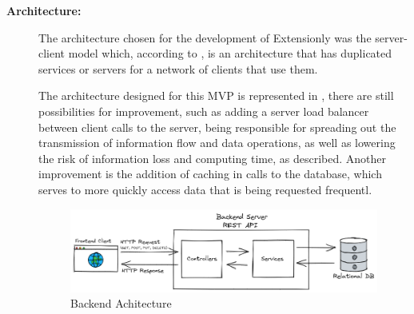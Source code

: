 \begin{description}
    
    \item[\textbf{Architecture:}] The architecture chosen for the development of Extensionly was the server-client model which, according to \textcite{puliafito_riccobene_scarpa}, is an architecture that has duplicated services or servers for a network of clients that use them.
    
    
    The architecture designed for this \ac{MVP} is represented in , there are still possibilities for improvement, such as adding a server load balancer between client calls to the server, being responsible for spreading out the transmission of information flow and data operations, as well as lowering the risk of information loss and computing time, as \textcite{Chen_2015} described.
    Another improvement is the addition of caching in calls to the database, which serves to more quickly access data that is being requested frequentl.
    
    \begin{figure}[htb]
      \caption{Backend Achitecture}\label{fig:architecture}
      \begin{center}
        \includegraphics[width=15cm]{img/6-architecture.png}
      \end{center}
    \end{figure}
    

\end{description}
